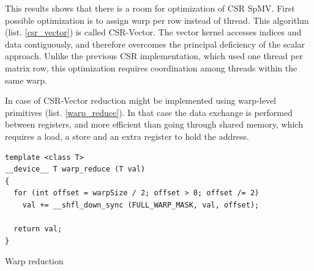 \documentclass{article}
\begin{document}
This results shows that there is a room for optimization of CSR SpMV. First possible optimization is to assign warp per row instead of thread.
This algorithm (list. \ref{csr_vector}) is called CSR-Vector. The vector kernel accesses indices and data contiguously, and therefore overcomes 
the principal deficiency of the scalar approach. Unlike the previous CSR implementation, which used one thread per matrix row, this optimization requires
coordination among threads within the same warp. 

\begin{figure}[H]
\centering
{}
\qquad %
\end{figure}

In case of CSR-Vector reduction might be implemented using warp-level primitives (list. \ref{warp_reduce}). In that case the data 
exchange is performed between registers, and more efficient than going through shared memory, which requires a load, 
a store and an extra register to hold the address.

\begin{listing}[H]
\begin{verbatim}
template <class T>
__device__ T warp_reduce (T val)
{
  for (int offset = warpSize / 2; offset > 0; offset /= 2)
    val += __shfl_down_sync (FULL_WARP_MASK, val, offset);

  return val;
}
\end{verbatim}
\caption{Warp reduction}
\label{warp_reduce}
\end{listing}
\end{document}
